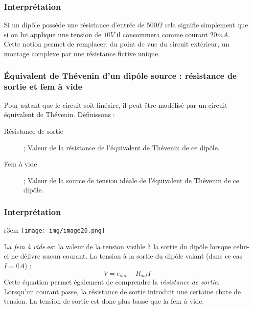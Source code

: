 \subsubsection{Interprétation}
Si un dipôle possède une résistance d'entrée de $500\Omega$ cela signifie simplement que si on lui applique une tension de $10V$ il consommera comme courant $20 mA$.\\

Cette notion permet de remplacer, du point de vue du circuit extérieur, un montage complexe par une résistance fictive unique.

\subsubsection{Équivalent de Thévenin d'un dipôle source : résistance de sortie et fem à vide}
Pour autant que le circuit soit linéaire, il peut être modélisé par un circuit équivalent de Thévenin. Définissons :
\begin{description}
	\item[Résistance de sortie] ; Valeur de la résistance de l'équivalent de Thévenin de ce dipôle.
	\item[Fem à vide] ; Valeur de la source de tension idéale de l'équivalent de Thévenin de ce dipôle.
\end{description}

\subsubsection{Interprétation}
\begin{wrapfigure}[8]{r}{3cm}
	\texttt{[image: img/image20.png]}
\end{wrapfigure}
La \textit{fem à vide} est la valeur de la tension visible à la sortie du dipôle lorsque celui-ci ne délivre aucun courant. La tension à la sortie du dipôle valant (dans ce cas $I = 0A$) :
\begin{equation}
	V = e_{out} - R_{out}I
\end{equation}
Cette équation permet également de comprendre la \textit{résistance de sortie}. Lorsqu'un courant passe, la résistance de sortie introduit une certaine chute de tension. La tension de sortie est donc plus basse que la fem à vide.\\



